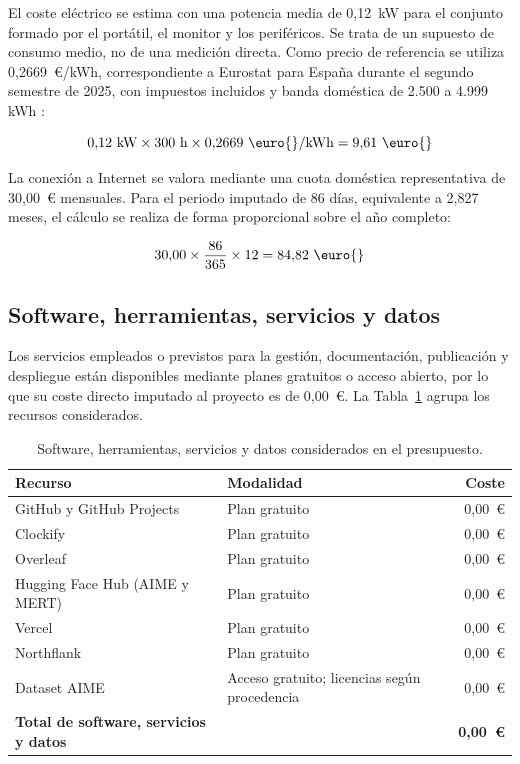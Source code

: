 El coste eléctrico se estima con una potencia media de 0,12~kW para el conjunto formado por el portátil, el monitor y los periféricos. Se trata de un supuesto de consumo medio, no de una medición directa. Como precio de referencia se utiliza 0,2669~\euro{}/kWh, correspondiente a Eurostat para España durante el segundo semestre de 2025, con impuestos incluidos y banda doméstica de 2.500 a 4.999 kWh \cite{eurostatNrgPc2042025S2}:

\[
    0{,}12~\text{kW} \times 300~\text{h} \times 0{,}2669~\text{\euro{}/kWh} = 9{,}61~\text{\euro{}}
\]

La conexión a Internet se valora mediante una cuota doméstica representativa de 30,00~\euro{} mensuales. Para el periodo imputado de 86 días, equivalente a 2,827 meses, el cálculo se realiza de forma proporcional sobre el año completo:

\[
    30{,}00 \times \frac{86}{365} \times 12 = 84{,}82~\text{\euro{}}
\]

\subsection*{Software, herramientas, servicios y datos}

Los servicios empleados o previstos para la gestión, documentación, publicación y despliegue están disponibles mediante planes gratuitos o acceso abierto, por lo que su coste directo imputado al proyecto es de 0,00~\euro{}. La Tabla~\ref{tab:presupuesto-herramientas} agrupa los recursos considerados.

\begin{table}[H]
    \centering
    \begin{tabularx}{\textwidth}{>{\raggedright\arraybackslash}X>{\raggedright\arraybackslash}Xr}
        \hline
        \textbf{Recurso} & \textbf{Modalidad} & \textbf{Coste} \\
        \hline
        GitHub y GitHub Projects & Plan gratuito & 0,00~\euro{} \\
        Clockify & Plan gratuito & 0,00~\euro{} \\
        Overleaf & Plan gratuito & 0,00~\euro{} \\
        Hugging Face Hub (AIME y MERT) & Plan gratuito & 0,00~\euro{} \\
        Vercel & Plan gratuito & 0,00~\euro{} \\
        Northflank & Plan gratuito & 0,00~\euro{} \\
        Dataset AIME & Acceso gratuito; licencias según procedencia & 0,00~\euro{} \\
        \hline
        \textbf{Total de software, servicios y datos} &  & \textbf{0,00~\euro{}} \\
        \hline
    \end{tabularx}
    \caption{Software, herramientas, servicios y datos considerados en el presupuesto.}
    \label{tab:presupuesto-herramientas}
\end{table}

